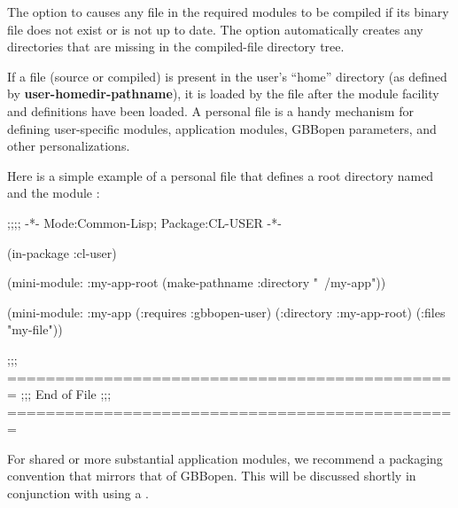 \documentclass[10pt,twoside,english,pdftex]{article}
\begin{document}
%
%
The  option to \textbf{} causes
any file in the required modules to be compiled if its binary file does not
exist or is not up to date.  The  option automatically
creates any directories that are missing in the compiled-file directory tree.


%
%
%
%
%
If a  file (source or compiled) is present in
the user's ``home'' directory (as defined by
\textbf{user-homedir-pathname}), it is loaded by the
 file after the
module facility and definitions have been loaded.  A personal
 file is a handy mechanism for defining
user-specific modules, application modules, GBBopen parameters, and
other personalizations.

Here is a simple example of a personal  file
that defines a root directory named  and the module
:

\begin{example}
  ;;;; -*- Mode:Common-Lisp; Package:CL-USER -*-

  (in-package :cl-user)

  (mini-module: :my-app-root 
      (make-pathname :directory "~/my-app"))    

  (mini-module: :my-app
    (:requires :gbbopen-user)
    (:directory :my-app-root)
    (:files "my-file"))

  ;;; ===============================================
  ;;;   End of File
  ;;; ===============================================
\end{example}

For shared or more substantial application modules, we recommend a
packaging convention that mirrors that of GBBopen.  This will be
discussed shortly in conjunction with using a .
\end{document}
